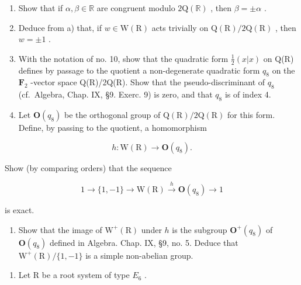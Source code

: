 \begin{enumerate}
\def\labelenumi{\alph{enumi})}
\item
  Show that if \(\alpha, \beta \in \mathbb{R}\) are congruent modulo \(2\mathrm{Q}(\mathbb{R})\) , then \(\beta = \pm \alpha\) .
\item
  Deduce from a) that, if \(w \in \mathrm{W}(\mathrm{R})\) acts trivially on \(\mathrm{Q}(\mathrm{R}) / 2\mathrm{Q}(\mathrm{R})\) , then \(w = \pm 1\) .
\item
  With the notation of no. 10, show that the quadratic form \(\frac{1}{2}(x|x)\) on Q(R) defines by passage to the quotient a non-degenerate quadratic form \(q_{8}\) on the \(\mathbf{F}_2\) -vector space Q(R)/2Q(R). Show that the pseudo-discriminant of \(q_{8}\) (cf.~Algebra, Chap. IX, §9. Exerc. 9) is zero, and that \(q_{8}\) is of index 4.
\item
  Let \(\mathbf{O}(q_{8})\) be the orthogonal group of \(\mathrm{Q}(\mathrm{R})/2\mathrm{Q}(\mathrm{R})\) for this form. Define, by passing to the quotient, a homomorphism
\end{enumerate}

\[
h: \mathrm{W} (\mathrm{R}) \rightarrow \mathbf {O} (q _ {8}).
\]

Show (by comparing orders) that the sequence

\[
1 \rightarrow \{1, - 1 \} \rightarrow \mathrm{W(R)} \stackrel {h} {\longrightarrow} \mathbf {O} (q _ {8}) \rightarrow 1
\]

is exact.

\begin{enumerate}
\def\labelenumi{\alph{enumi})}
\setcounter{enumi}{4}
\tightlist
\item
  Show that the image of \(\mathrm{W}^{+}(\mathrm{R})\) under \(h\) is the subgroup \(\mathbf{O}^{+}(q_{8})\) of \(\mathbf{O}(q_8)\) defined in Algebra. Chap. IX, §9, no. 5. Deduce that \(\mathrm{W}^{+}(\mathrm{R}) / \{1, -1\}\) is a simple non-abelian group.
\end{enumerate}

\begin{enumerate}
\def\labelenumi{\arabic{enumi})}
\setcounter{enumi}{1}
\tightlist
\item
  Let R be a root system of type \(E_{6}\) .
\end{enumerate}

